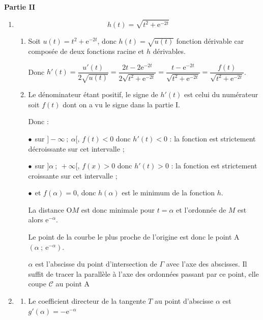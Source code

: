 \begin{center}\textbf{Partie II}\end{center}














\begin{enumerate}
\item 





\[h(t) = \sqrt{t^2 + \text{e}^{-2t}}\]

	\begin{enumerate}
		\item 
Soit $u(t) = t^2 + \text{e}^{-2t}$, donc $h(t) = \sqrt{u(t)}$ fonction dérivable car composée de deux fonctions \og racine \fg{}  et $h$ dérivables.

Donc $h'(t) = \dfrac{u'(t)}{2\sqrt{u(t)}} = \dfrac{2t - 2\text{e}^{-2t}}{2\sqrt{t^2 + \text{e}^{-2t}}} = \dfrac{t - \text{e}^{-2t}}{\sqrt{t^2 + \text{e}^{-2t}}} = \dfrac{f(t)}{\sqrt{t^2 + \text{e}^{-2t}}}$.



		\item 
		
Le dénominateur étant positif, le signe de $h'(t)$ est celui du numérateur soit $f(t)$ dont on a vu le signe dans la partie I.

Donc :

$\bullet~~$sur $]- \infty~;~\alpha[, \, f(t) < 0$ donc $h'(t) < 0$ : la fonction est strictement décroissante sur cet intervalle ;

$\bullet~~$sur $]\alpha~;~+ \infty[, \, f(x) > 0$ donc $h'(t) > 0$ : la fonction est strictement croissante sur cet intervalle ;

$\bullet~~$et $f(\alpha) = 0$, donc $h(\alpha)$ est le minimum de la fonction $h$.

La distance O$M$ est donc minimale pour $t = \alpha$ et l'ordonnée de $M$ est alors $\text{e}^{- \alpha}$.

Le point de la courbe le plus proche de l'origine est donc le point A$\left(\alpha~;~\text{e}^{-\alpha}\right)$.


$\alpha$ est l'abscisse du point d'intersection de $\Gamma$ avec l'axe des abscisses. Il suffit de tracer la parallèle à l'axe des ordonnées passant par ce point, elle coupe $\mathcal{C}$ au point A
	\end{enumerate}
\item 
	\begin{enumerate}
		\item 
Le coefficient directeur de la tangente $T$ au point d'abscisse $\alpha$ est $g'(\alpha) = - \text{e}^{- \alpha}$		







\end{enumerate}
\end{enumerate}
